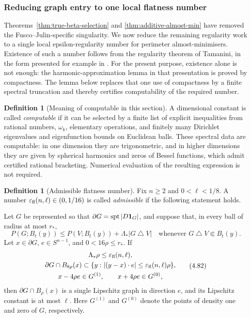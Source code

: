 \documentclass[11pt]{amsart}
\theoremstyle{definition}
\newtheorem{definition}[theorem]{Definition}
\newcommand{\Per}{P}
\begin{document}
\subsubsection{Reducing graph entry to one local flatness number}

Theorems~\ref{thm:true-beta-selection} and
\ref{thm:additive-almost-min} have removed the Fusco--Julin-specific
singularity.  We now reduce the remaining regularity work to a single local
epsilon-regularity number for perimeter almost-minimisers.  Existence of such
a number follows from the regularity theorem of Tamanini, in the form
presented for example in \cite[Chapters 24--26]{Maggi2012}.  For the present
purpose, existence alone is not enough: the harmonic-approximation lemma in
that presentation is proved by compactness.  The lemma below replaces that
one use of compactness by a finite spectral truncation and thereby certifies
computability of the required number.

\begin{definition}[Meaning of computable in this section]\label{def:computable}
A dimensional constant is called \emph{computable} if it can be selected by
a finite list of explicit inequalities from rational numbers, \(\omega_k\),
elementary operations, and finitely many Dirichlet eigenvalues and
eigenfunction bounds on Euclidean balls.  These spectral data are
computable: in one dimension they are trigonometric, and in higher
dimensions they are given by spherical harmonics and zeros of Bessel
functions, which admit certified rational bracketing.  Numerical evaluation
of the resulting expression is not required.
\end{definition}

\begin{definition}[Admissible flatness number]\label{def:flat-number}
Fix \(n\ge2\) and \(0<\ell<1/8\).  A number
\(\varepsilon_{\rm fl}(n,\ell)\in(0,1/16)\) is called
\emph{admissible} if the following statement holds.

Let \(G\) be represented so that
\(\partial G=\operatorname{spt}|D{\bf1}_G|\), and suppose that, in every
ball of radius at most \(r_*\),
\[
   \Per(G;B_t(y))
   \le\Per(V;B_t(y))+\Lambda_*|G\mathbin{\triangle}V|
   \quad\text{whenever }G\mathbin{\triangle}V\Subset B_t(y).
\tag{4.81}\label{eq:local-am-input}
\]
Let \(x\in\partial G\), \(e\in S^{n-1}\), and \(0<16\rho\le r_*\).
If
\[
\begin{gathered}
   \Lambda_*\rho\le\varepsilon_{\rm fl}(n,\ell),\\
   \partial G\cap B_{8\rho}(x)
      \subset
      \{y: |(y-x)\cdot e|\le
                 \varepsilon_{\rm fl}(n,\ell)\rho\},\\
   x-4\rho e\in G^{(1)},\qquad x+4\rho e\in G^{(0)},
\end{gathered}
\tag{4.82}\label{eq:local-flat-input}
\]
then \(\partial G\cap B_\rho(x)\) is a single Lipschitz graph in
direction \(e\), and its Lipschitz constant is at most \(\ell\).
Here \(G^{(1)}\) and \(G^{(0)}\) denote the points of density one and
zero of \(G\), respectively.
\end{definition}
\end{document}
